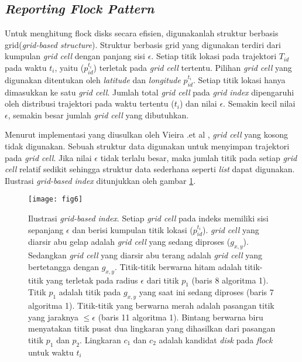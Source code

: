 \subsection{\textit{Reporting Flock Pattern}}
\par Untuk menghitung flock disks secara efisien, digunakanlah struktur berbasis grid(\textit{grid-based structure}). Struktur berbasis grid yang digunakan terdiri dari kumpulan \textit{grid cell} dengan panjang sisi $\epsilon$. Setiap titik lokasi pada trajektori $T_{id}$ pada waktu $t_i$, yaitu ($p_{id}^{t_i}$) terletak pada \textit{grid cell} tertentu. Pilihan \textit{grid cell} yang digunakan ditentukan oleh \textit{latitude} dan \textit{longitude} $p_{id}^{t_i}$. Setiap titik lokasi hanya dimasukkan ke satu \textit{grid cell}. Jumlah total \textit{grid cell} pada \textit{grid index} dipengaruhi oleh distribusi trajektori pada waktu tertentu ($t_{i}$) dan nilai $\epsilon$. Semakin kecil nilai $\epsilon$, semakin besar jumlah \textit{grid cell} yang dibutuhkan. 

\par Menurut implementasi yang diusulkan oleh Vieira .et al \cite{flock_pattern_discovery_2:09}, \textit{grid cell} yang kosong tidak digunakan. Sebuah struktur data digunakan untuk menyimpan trajektori pada \textit{grid cell}. Jika nilai $\epsilon$ tidak terlalu besar, maka jumlah titik pada setiap \textit{grid cell} relatif sedikit sehingga struktur data sederhana seperti \textit{list} dapat digunakan. Ilustrasi \textit{grid-based index} ditunjukkan oleh gambar \ref{fig:gidx}.

\begin{figure}[H]
	\centering  
	\texttt{[image: fig6]}  
	\caption{Ilustrasi \textit{grid-based index}. Setiap \textit{grid cell} pada indeks memiliki sisi sepanjang $\epsilon$ dan berisi kumpulan titik lokasi ($p_{id}^{t_i}$). \textit{grid cell} yang diarsir abu gelap adalah \textit{grid cell} yang sedang diproses ($g_{x,y}$). Sedangkan \textit{grid cell} yang diarsir abu terang adalah \textit{grid cell} yang bertetangga dengan $g_{x,y}$. Titik-titik berwarna hitam adalah titik-titik yang terletak pada radius $\epsilon$ dari titik $p_1$ (baris 8 algoritma 1). Titik $p_1$ adalah titik pada $g_{x,y}$ yang saat ini sedang diproses (baris 7 algoritma 1). Titik-titik yang berwarna merah adalah pasangan titik yang jaraknya $\leq\epsilon$ (baris 11 algoritma 1). Bintang berwarna biru menyatakan titik pusat dua lingkaran yang dihasilkan dari pasangan titik $p_1$ dan $p_2$. Lingkaran $c_1$ dan $c_2$ adalah kandidat \textit{disk} pada \textit{flock} untuk waktu $t_i$} 
	\label{fig:gidx} 
\end{figure}

